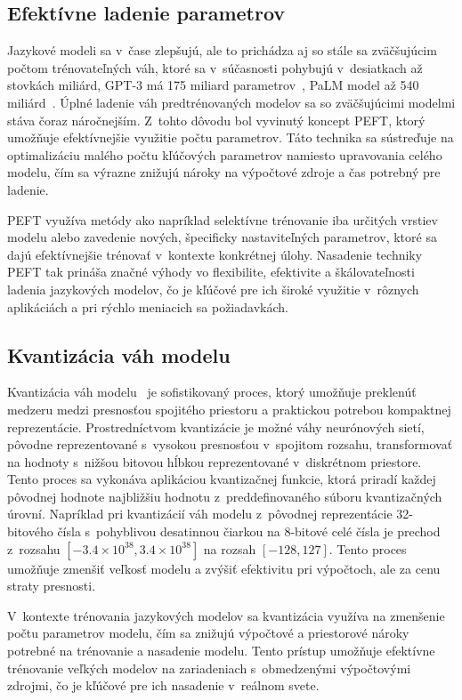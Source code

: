 \subsection{Efektívne ladenie parametrov}
Jazykové modeli sa v~čase zlepšujú, ale to prichádza aj so stále sa zväčšujúcim počtom trénovateľných váh, ktoré sa v~súčasnosti pohybujú v~desiatkach až stovkách miliárd, GPT-3 má 175 miliard parametrov~\cite{brown2020language}, PaLM model až 540 miliárd~\cite{chowdhery2022palm}. Úplné ladenie váh predtrénovaných modelov sa so zväčšujúcimi modelmi stáva čoraz náročnejším. Z~tohto dôvodu bol vyvinutý koncept PEFT, ktorý umožňuje efektívnejšie využitie počtu parametrov. Táto technika sa sústreďuje na optimalizáciu malého počtu kľúčových parametrov namiesto upravovania celého modelu, čím sa výrazne znižujú nároky na výpočtové zdroje a čas potrebný pre ladenie.

PEFT využíva metódy ako napríklad selektívne trénovanie iba určitých vrstiev modelu alebo zavedenie nových, špecificky nastaviteľných parametrov, ktoré sa dajú efektívnejšie trénovať v~kontexte konkrétnej úlohy. Nasadenie techniky PEFT tak prináša značné výhody vo flexibilite, efektivite a škálovateľnosti ladenia jazykových modelov, čo je kľúčové pre ich široké využitie v~rôznych aplikáciách a pri rýchlo meniacich sa požiadavkách.

\subsection{Kvantizácia váh modelu}

Kvantizácia váh modelu~\cite{rokh2022modelquantization} je sofistikovaný proces, ktorý umožňuje preklenúť medzeru medzi presnosťou spojitého priestoru a praktickou potrebou kompaktnej reprezentácie. Prostredníctvom kvantizácie je možné váhy neurónových sietí, pôvodne reprezentované s~vysokou presnosťou v~spojitom rozsahu, transformovať na hodnoty s~nižšou bitovou hĺbkou reprezentované v~diskrétnom priestore. Tento proces sa vykonáva aplikáciou kvantizačnej funkcie, ktorá priradí každej pôvodnej hodnote najbližšiu hodnotu z~preddefinovaného súboru kvantizačných úrovní. Napríklad pri kvantizácií váh modelu z~pôvodnej reprezentácie 32-bitového čísla s~pohyblivou desatinnou čiarkou na 8-bitové celé čísla je prechod z~rozsahu $[-3.4\times 10^{38}, 3.4\times 10^{38}]$ na rozsah $[-128, 127]$. Tento proces umožňuje zmenšiť veľkosť modelu a zvýšiť efektivitu pri výpočtoch, ale za cenu straty presnosti.

V~kontexte trénovania jazykových modelov sa kvantizácia využíva na zmenšenie počtu parametrov modelu, čím sa znižujú výpočtové a priestorové nároky potrebné na trénovanie a nasadenie modelu. Tento prístup umožňuje efektívne trénovanie veľkých modelov na zariadeniach s~obmedzenými výpočtovými zdrojmi, čo je kľúčové pre ich nasadenie v~reálnom svete.


